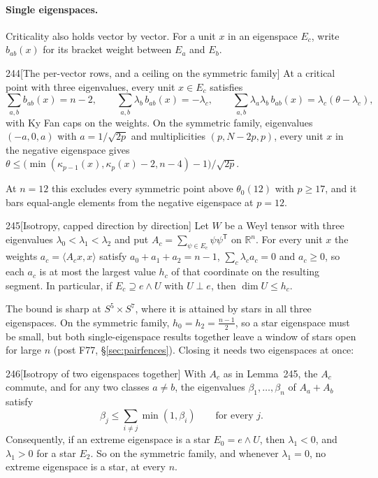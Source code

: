 \paragraph{Single eigenspaces.} Criticality also holds vector by vector. For a unit $x$ in an eigenspace $E_c$, write $b_{ab}(x)$ for its bracket weight between $E_a$ and $E_b$.

\begin{Lem}{244}[The per-vector rows, and a ceiling on the symmetric family]
At a critical point with three eigenvalues, every unit $x\in E_c$ satisfies
\[
\sum_{a,b}b_{ab}(x)=n-2,\qquad\sum_{a,b}\lambda_b\,b_{ab}(x)=-\lambda_c,\qquad\sum_{a,b}\lambda_a\lambda_b\,b_{ab}(x)=\lambda_c(\theta-\lambda_c),
\]
with Ky Fan caps on the weights. On the symmetric family, eigenvalues $(-a,0,a)$ with $a=1/\sqrt{2p}$ and multiplicities $(p,N-2p,p)$, every unit $x$ in the negative eigenspace gives $\theta\le\big(\min(\kappa_{p-1}(x),\kappa_p(x)-2,n-4)-1\big)/\sqrt{2p}$.
\end{Lem}

At $n=12$ this excludes every symmetric point above $\theta_0(12)$ with $p\ge17$, and it bars equal-angle elements from the negative eigenspace at $p=12$.

\begin{Lem}{245}[Isotropy, capped direction by direction]
Let $W$ be a Weyl tensor with three eigenvalues $\lambda_0<\lambda_1<\lambda_2$ and put $A_c=\sum_{\psi\in E_c}\psi\psi^{\mathsf T}$ on $\mathbb R^n$. For every unit $x$ the weights $a_c=\langle A_cx,x\rangle$ satisfy $a_0+a_1+a_2=n-1$, $\sum_c\lambda_ca_c=0$ and $a_c\ge0$, so each $a_c$ is at most the largest value $h_c$ of that coordinate on the resulting segment. In particular, if $E_c\supseteq e\wedge U$ with $U\perp e$, then $\dim U\le h_c$.
\end{Lem}

The bound is sharp at $S^5\times S^7$, where it is attained by stars in all three eigenspaces. On the symmetric family, $h_0=h_2=\tfrac{n-1}2$, so a star eigenspace must be small, but both single-eigenspace results together leave a window of stars open for large $n$ (post F77, \S\ref{sec:pairfences}). Closing it needs two eigenspaces at once:

\begin{Lem}{246}[Isotropy of two eigenspaces together]
With $A_c$ as in Lemma~245, the $A_c$ commute, and for any two classes $a\ne b$, the eigenvalues $\beta_1,\dots,\beta_n$ of $A_a+A_b$ satisfy
\[
\beta_j\le\sum_{i\ne j}\min(1,\beta_i)\qquad\text{for every }j .
\]
Consequently, if an extreme eigenspace is a star $E_0=e\wedge U$, then $\lambda_1<0$, and $\lambda_1>0$ for a star $E_2$. So on the symmetric family, and whenever $\lambda_1=0$, no extreme eigenspace is a star, at every $n$.
\end{Lem}

